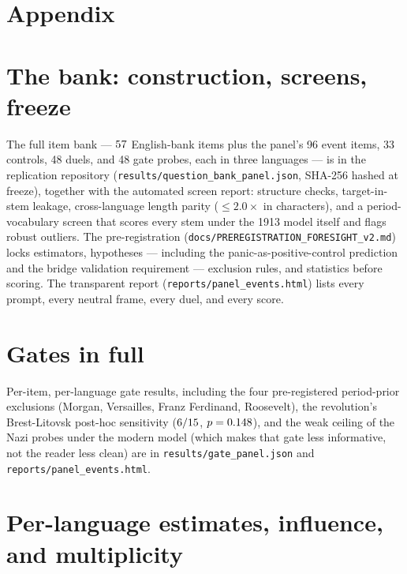 \documentclass[11pt]{article}
\begin{document}
\clearpage
\appendix
\renewcommand{\thesection}{\Alph{section}}
\section*{Appendix}

\section{The bank: construction, screens, freeze}\label{app:bank}
The full item bank --- $57$ English-bank items plus the panel's 96 event items, 33 controls, 48 duels,
and 48 gate probes, each in three languages --- is in the replication repository
(\texttt{results/question\_bank\_panel.json}, SHA-256 hashed at freeze), together with the automated screen
report: structure checks, target-in-stem leakage, cross-language length parity ($\le 2.0\times$ in
characters), and a period-vocabulary screen that scores every stem under the 1913 model itself and flags
robust outliers. The pre-registration (\texttt{docs/PREREGISTRATION\_FORESIGHT\_v2.md}) locks estimators,
hypotheses --- including the panic-as-positive-control prediction and the bridge validation requirement ---
exclusion rules, and statistics before scoring. The transparent report
(\texttt{reports/panel\_events.html}) lists every prompt, every neutral frame, every duel, and every score.

\section{Gates in full}\label{app:gates}
Per-item, per-language gate results, including the four pre-registered period-prior exclusions (Morgan,
Versailles, Franz Ferdinand, Roosevelt), the revolution's Brest-Litovsk post-hoc sensitivity
($6/15$, $p=0.148$), and the weak ceiling of the Nazi probes under the modern model
(which makes that gate less informative, not the reader less clean) are in
\texttt{results/gate\_panel.json} and \texttt{reports/panel\_events.html}.

\section{Per-language estimates, influence, and multiplicity}\label{app:lang}
\begin{table}[h]\centering\small

\caption{Per-language $\Delta$ at the nearest pre-event reader; floor and ceiling rows on the identical
estimator. Hyperinflation's French estimate ($\NpaninflFR$, $p=\NpaninflPFR$) is the only cell surviving the
Benjamini--Hochberg correction across the eight events; the largest leave-one-out shift for the pooled
hyperinflation estimate is $0.46$ nats. The German ceiling value illustrates the register sensitivity of
cross-family comparison discussed in Section~\ref{sec:validity}.}
\end{table}
\end{document}
